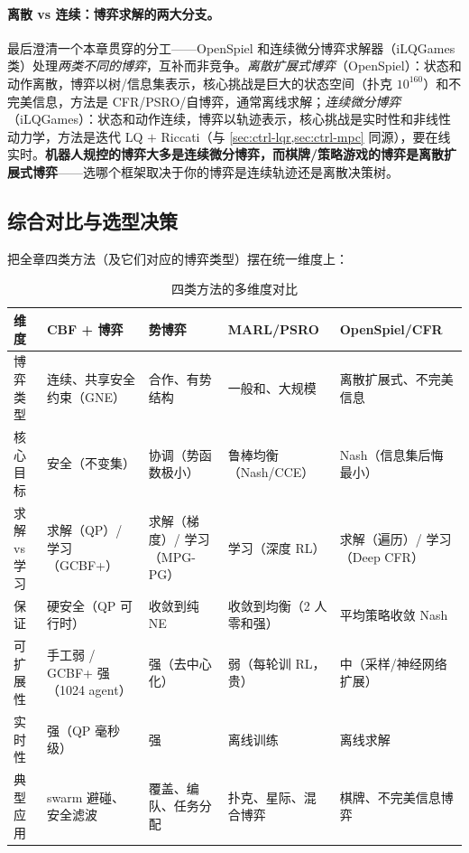 \paragraph{离散 vs 连续：博弈求解的两大分支。}
最后澄清一个本章贯穿的分工——OpenSpiel 和连续微分博弈求解器（iLQGames 类）处理\emph{两类不同的博弈}，互补而非竞争。\emph{离散扩展式博弈}（OpenSpiel）：状态和动作离散，博弈以树/信息集表示，核心挑战是巨大的状态空间（扑克 $10^{160}$）和不完美信息，方法是 CFR/PSRO/自博弈，通常离线求解；\emph{连续微分博弈}（iLQGames）：状态和动作连续，博弈以轨迹表示，核心挑战是实时性和非线性动力学，方法是迭代 LQ $+$ Riccati（与 \cref{sec:ctrl-lqr,sec:ctrl-mpc} 同源），要在线实时。\textbf{机器人规控的博弈大多是连续微分博弈，而棋牌/策略游戏的博弈是离散扩展式博弈}——选哪个框架取决于你的博弈是连续轨迹还是离散决策树。

\subsection{综合对比与选型决策}
\label{sec:sm-selection}

把全章四类方法（及它们对应的博弈类型）摆在统一维度上：

\begin{table}[H]\centering\small
\caption{四类方法的多维度对比}
\label{tab:sm-four-methods}
\begin{tabularx}{\linewidth}{p{} L L L L}
\toprule
维度 & CBF + 博弈 & 势博弈 & MARL/PSRO & OpenSpiel/CFR \\
\midrule
博弈类型 & 连续、共享安全约束（GNE） & 合作、有势结构 & 一般和、大规模 & 离散扩展式、不完美信息 \\
核心目标 & 安全（不变集） & 协调（势函数极小） & 鲁棒均衡（Nash/CCE） & Nash（信息集后悔最小） \\
求解 vs 学习 & 求解（QP）/ 学习（GCBF+） & 求解（梯度）/ 学习（MPG-PG） & 学习（深度 RL） & 求解（遍历）/ 学习（Deep CFR） \\
保证 & 硬安全（QP 可行时） & 收敛到纯 NE & 收敛到均衡（2 人零和强） & 平均策略收敛 Nash \\
可扩展性 & 手工弱 / GCBF+ 强（1024 agent） & 强（去中心化） & 弱（每轮训 RL，贵） & 中（采样/神经网络扩展） \\
实时性 & 强（QP 毫秒级） & 强 & 离线训练 & 离线求解 \\
典型应用 & swarm 避碰、安全滤波 & 覆盖、编队、任务分配 & 扑克、星际、混合博弈 & 棋牌、不完美信息博弈 \\
\bottomrule
\end{tabularx}
\end{table}

